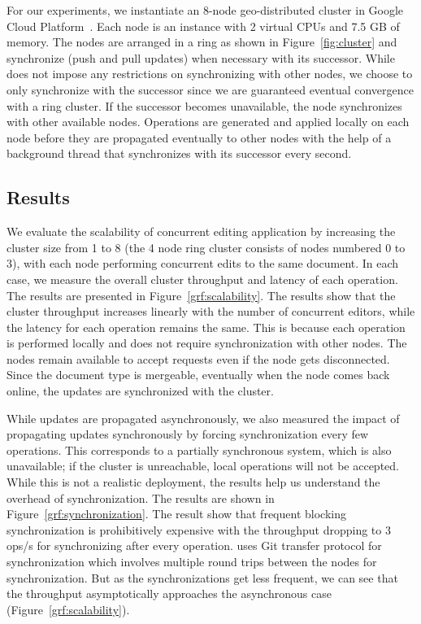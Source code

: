 For our experiments, we instantiate an 8-node geo-distributed cluster in Google
Cloud Platform~\cite{gcp}. Each node is an  instance with 2
virtual CPUs and 7.5 GB of memory. The nodes are arranged in a ring as shown in
Figure~\ref{fig:cluster} and synchronize (push and pull updates) when necessary
with its successor. While \name does not impose any restrictions on
synchronizing with other nodes, we choose to only synchronize with the
successor since we are guaranteed eventual convergence with a ring cluster. If
the successor becomes unavailable, the node synchronizes with other available
nodes. Operations are generated and applied locally on each node before they
are propagated eventually to other nodes with the help of a background thread
that synchronizes with its successor every second.

\subsection{Results}

We evaluate the scalability of concurrent editing application by increasing the
cluster size from 1 to 8 (the 4 node ring cluster consists of nodes numbered 0
to 3), with each node performing concurrent edits to the same document. In each
case, we measure the overall cluster throughput and latency of each operation.
The results are presented in Figure~\ref{grf:scalability}. The results show
that the cluster throughput increases linearly with the number of concurrent
editors, while the latency for each operation remains the same. This is because
each operation is performed locally and does not require synchronization with
other nodes. The nodes remain available to accept requests even if the node
gets disconnected. Since the document type is mergeable, eventually when the
node comes back online, the updates are synchronized with the cluster.

While updates are propagated asynchronously, we also measured the impact of
propagating updates synchronously by forcing synchronization every few
operations. This corresponds to a partially synchronous system, which is also
unavailable; if the cluster is unreachable, local operations will not be
accepted. While this is not a realistic deployment, the results help us
understand the overhead of synchronization. The results are shown in
Figure~\ref{grf:synchronization}. The result show that frequent blocking
synchronization is prohibitively expensive with the throughput dropping to 3
ops/s for synchronizing after every operation. \name uses Git transfer protocol
for synchronization which involves multiple round trips between the nodes for
synchronization. But as the synchronizations get less frequent, we can see that
the throughput asymptotically approaches the asynchronous case
(Figure~\ref{grf:scalability}).

